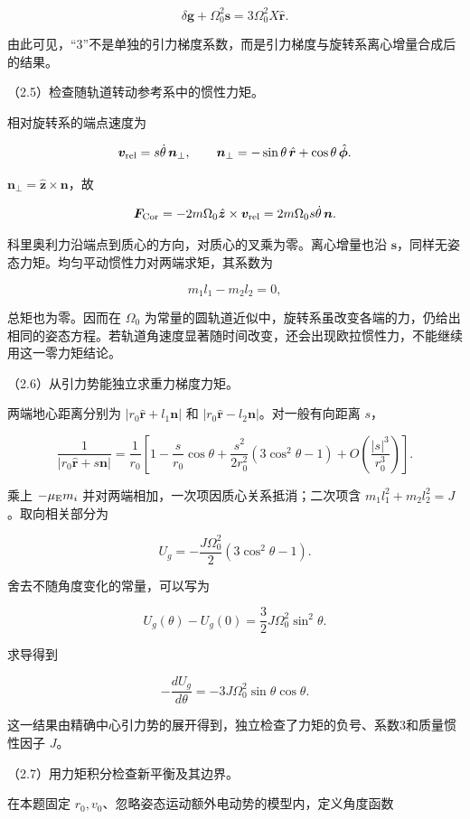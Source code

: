 \documentclass[12pt,a4paper,fontset=fandol]{ctexart}
\begin{document}
\[
\delta\boldsymbol g+\Omega_0^2\boldsymbol s
=3\Omega_0^2X\hat{\boldsymbol r}.
\]

由此可见，``3''不是单独的引力梯度系数，而是引力梯度与旋转系离心增量合成后的结果。

（2.5）检查随轨道转动参考系中的惯性力矩。

相对旋转系的端点速度为

\[
\boldsymbol v_{\rm rel}=s\dot\theta\,\boldsymbol n_\perp,\qquad
\boldsymbol n_\perp=-\sin\theta\,\hat{\boldsymbol r}
+\cos\theta\,\hat{\boldsymbol\phi}.
\]

\(\boldsymbol n_\perp=\hat{\boldsymbol z}\times\boldsymbol n\)，故

\[
\boldsymbol F_{\rm Cor}
=-2m\Omega_0\hat{\boldsymbol z}\times\boldsymbol v_{\rm rel}
=2m\Omega_0s\dot\theta\,\boldsymbol n.
\]

科里奥利力沿端点到质心的方向，对质心的叉乘为零。离心增量也沿
\(\boldsymbol s\)，同样无姿态力矩。均匀平动惯性力对两端求矩，其系数为

\[
m_1l_1-m_2l_2=0,
\]

总矩也为零。因而在 \(\Omega_0\)
为常量的圆轨道近似中，旋转系虽改变各端的力，仍给出相同的姿态方程。若轨道角速度显著随时间改变，还会出现欧拉惯性力，不能继续用这一零力矩结论。

（2.6）从引力势能独立求重力梯度力矩。

两端地心距离分别为 \(|r_0\hat{\boldsymbol r}+l_1\boldsymbol n|\) 和
\(|r_0\hat{\boldsymbol r}-l_2\boldsymbol n|\)。对一般有向距离 \(s\)，

\[
\frac1{|r_0\hat{\boldsymbol r}+s\boldsymbol n|}
=\frac1{r_0}\left[
1-\frac{s}{r_0}\cos\theta
+\frac{s^2}{2r_0^2}(3\cos^2\theta-1)
+O\left(\frac{|s|^3}{r_0^3}\right)\right].
\]

乘上 \(-\mu_{\rm E}m_i\) 并对两端相加，一次项因质心关系抵消；二次项含
\(m_1l_1^2+m_2l_2^2=J\)。取向相关部分为

\[
U_g=-\frac{J\Omega_0^2}{2}(3\cos^2\theta-1).
\]

舍去不随角度变化的常量，可以写为

\[
U_g(\theta)-U_g(0)=\frac32J\Omega_0^2\sin^2\theta.
\]

求导得到

\[
-\frac{dU_g}{d\theta}
=-3J\Omega_0^2\sin\theta\cos\theta.
\]

这一结果由精确中心引力势的展开得到，独立检查了力矩的负号、系数3和质量惯性因子
\(J\)。

（2.7）用力矩积分检查新平衡及其边界。

在本题固定 \(r_0,v_0\)、忽略姿态运动额外电动势的模型内，定义角度函数
\end{document}
